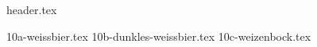 \clearpage
{}
\divisorLine
{header.tex}
\begin{multicols*}{2}
{10a-weissbier.tex}
{10b-dunkles-weissbier.tex}
{10c-weizenbock.tex}
\end{multicols*}
